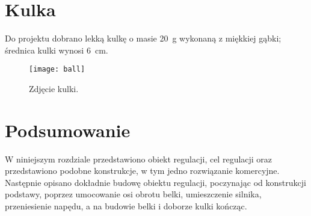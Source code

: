 \section{Kulka}

Do projektu dobrano lekką kulkę o masie \SI{20}{g} wykonaną z miękkiej gąbki; średnica kulki wynosi \SI{6}{cm}.

\begin{figure}[H]
    \centering
    \texttt{[image: ball]}
    \caption{Zdjęcie kulki.}
    \label{fig:kulka}
\end{figure}

\section{Podsumowanie}

W niniejszym rozdziale przedstawiono obiekt regulacji, cel regulacji oraz przedstawiono podobne konstrukcje, w tym jedno rozwiązanie komercyjne. Następnie opisano dokładnie budowę obiektu regulacji, poczynając od konstrukcji podstawy, poprzez umocowanie osi obrotu belki, umieszczenie silnika, przeniesienie napędu, a na budowie belki i doborze kulki kończąc.

